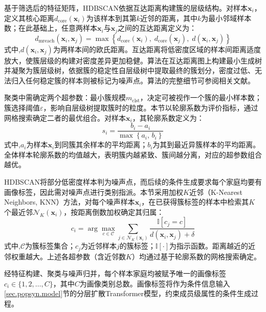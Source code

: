 基于筛选后的特征矩阵，HDBSCAN依据互达距离构建簇的层级结构。对样本$\mathbf{x}_i$，定义其核心距离$d_{\text{core}}(\mathbf{x}_i)$为该样本到其第$k$近邻的距离，其中$k$为最小邻域样本数；在此基础上，任意两样本$\mathbf{x}_i$与$\mathbf{x}_j$之间的互达距离定义为：
\begin{equation}
  d_{\text{mreach}}(\mathbf{x}_i, \mathbf{x}_j) = \max\left\{ d_{\text{core}}(\mathbf{x}_i),\; d_{\text{core}}(\mathbf{x}_j),\; d(\mathbf{x}_i, \mathbf{x}_j) \right\}
  \label{eq.popsyn.mreach}
\end{equation}
式中,$d(\mathbf{x}_i, \mathbf{x}_j)$为两样本间的欧氏距离。互达距离将低密度区域的样本间距离适度放大，使簇层级的构建对密度差异更加稳健。算法在互达距离图上构建最小生成树并凝聚为簇层级树，依据簇的稳定性自层级树中提取最终的簇划分，密度过低、无法归入任何稳定簇的样本则被标记为噪声点。算法的完整细节可参阅相关文献\cite{mcinnesHdbscanHierarchicalDensity2017}。
 
聚类中需确定两个超参数：最小簇规模$m_{\text{clst}}$，决定可被视作一个簇的最小样本数；簇选择阈值$\varepsilon$，影响自层级树提取簇时的粒度。本节以轮廓系数为评价指标，通过网格搜索确定二者的最优组合。对样本$\mathbf{x}_i$，其轮廓系数定义为：
\begin{equation}
  s_i = \frac{b_i - a_i}{\max\left\{ a_i,\, b_i \right\}}
  \label{eq.popsyn.silhouette}
\end{equation}
式中,$a_i$为样本$\mathbf{x}_i$到同簇其余样本的平均距离；$b_i$为其到最近异簇样本的平均距离。全体样本轮廓系数的均值越大，表明簇内越紧致、簇间越分离，对应的超参数组合越优。
 
HDBSCAN将部分低密度样本判为噪声点，而后续的条件生成要求每个家庭均要有画像标签，因此需对噪声点进行类别指派。本节采用加权$K$近邻（K-Nearest Neighbors, KNN）方法，对每个噪声样本$\mathbf{x}_i$，在已获得簇标签的样本中检索其$K$个最近邻$\mathcal{N}_K(\mathbf{x}_i)$，按距离倒数加权确定其归属：
\begin{equation}
  c_i = \arg\max_{c \in \mathcal{C}} \sum_{j \in \mathcal{N}_K(\mathbf{x}_i)} \frac{\mathbb{I}\left[ c_j = c \right]}{d(\mathbf{x}_i, \mathbf{x}_j) + \delta}
  \label{eq.popsyn.knn}
\end{equation}
式中,$\mathcal{C}$为簇标签集合；$c_j$为近邻样本$j$的簇标签；$\mathbb{I}[\cdot]$为指示函数。距离越近的近邻权重越大。上述各超参数（含近邻数$K$）均通过基于轮廓系数的网格搜索确定。
 
经特征构建、聚类与噪声归并，每个样本家庭均被赋予唯一的画像标签$c_i \in \{1, 2, \ldots, C\}$，其中$C$为画像类别总数。画像标签将作为条件信息输入\ref{sec.popsyn.model}节的分层扩散Transformer模型，约束成员级属性的条件生成过程。

